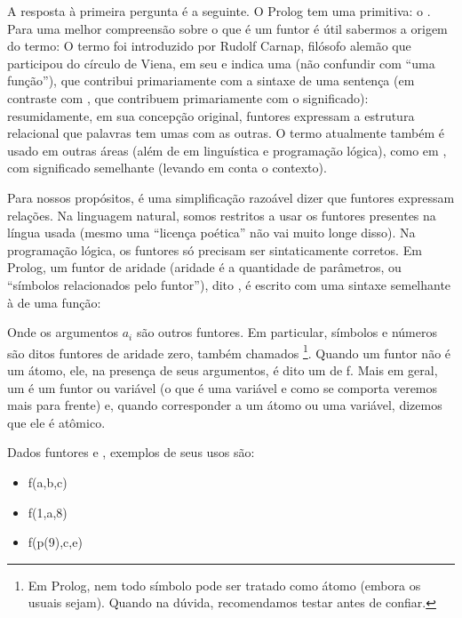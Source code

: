 A resposta à primeira pergunta é a seguinte. O Prolog tem uma primitiva: o . Para uma melhor compreensão sobre o que é um
funtor é útil sabermos a origem do termo: O termo  foi introduzido por Rudolf Carnap, filósofo alemão que
participou do círculo de Viena, em seu \cite{carnap} e indica uma 
(não confundir com ``uma função''), que contribui primariamente com a sintaxe de uma sentença (em contraste com ,
que contribuem primariamente com o significado): resumidamente, em sua concepção original, funtores expressam a estrutura
relacional que palavras tem umas com as outras. O termo atualmente também é usado em outras áreas (além de em linguística e
programação lógica), como em , com significado semelhante (levando em conta o contexto).

Para nossos propósitos, é uma simplificação razoável dizer que funtores expressam relações. Na linguagem natural, somos restritos a usar os funtores presentes na língua usada (mesmo uma ``licença poética'' não vai muito longe disso).
Na programação lógica, os funtores só precisam ser sintaticamente corretos. Em Prolog, um funtor
 de aridade  (aridade é a quantidade de parâmetros, ou ``símbolos relacionados pelo funtor''), dito
, é escrito com uma sintaxe semelhante à de uma função:


Onde os argumentos $a_i$ são outros funtores. Em particular, símbolos e números são ditos funtores
de aridade zero, também chamados \footnote{Em Prolog, nem todo símbolo pode ser
  tratado como átomo (embora os usuais sejam). Quando na dúvida, recomendamos testar antes de
  confiar.}. Quando um funtor  não é um átomo, ele, na presença de seus argumentos,
é dito um  de  f. Mais em geral, um  é um funtor ou variável (o que é uma variável e como se comporta  veremos mais para frente) e, quando corresponder a um átomo ou uma variável, dizemos que ele é atômico.

Dados funtores  e , exemplos de seus usos são:

\begin{itemize}
  \item f(a,b,c)
  \item f(1,a,8)
  \item f(p(9),c,e)
\end{itemize}

